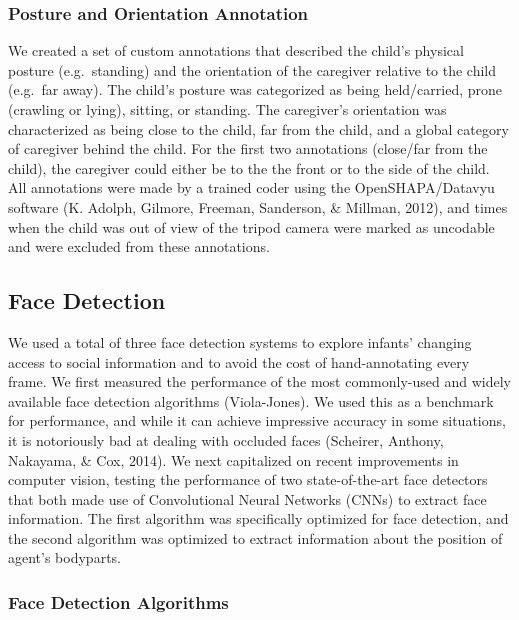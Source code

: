 \documentclass[10pt, letterpaper]{article}
\begin{document}
\subsubsection{Posture and Orientation
Annotation}\label{posture-and-orientation-annotation}

We created a set of custom annotations that described the child's
physical posture (e.g.~standing) and the orientation of the caregiver
relative to the child (e.g.~far away). The child's posture was
categorized as being held/carried, prone (crawling or lying), sitting,
or standing. The caregiver's orientation was characterized as being
close to the child, far from the child, and a global category of
caregiver behind the child. For the first two annotations (close/far
from the child), the caregiver could either be to the the front or to
the side of the child. All annotations were made by a trained coder
using the OpenSHAPA/Datavyu software (K. Adolph, Gilmore, Freeman,
Sanderson, \& Millman, 2012), and times when the child was out of view
of the tripod camera were marked as uncodable and were excluded from
these annotations.

\subsection{Face Detection}\label{face-detection}

We used a total of three face detection systems to explore infants'
changing access to social information and to avoid the cost of
hand-annotating every frame. We first measured the performance of the
most commonly-used and widely available face detection algorithms
(Viola-Jones). We used this as a benchmark for performance, and while it
can achieve impressive accuracy in some situations, it is notoriously
bad at dealing with occluded faces (Scheirer, Anthony, Nakayama, \& Cox,
2014). We next capitalized on recent improvements in computer vision,
testing the performance of two state-of-the-art face detectors that both
made use of Convolutional Neural Networks (CNNs) to extract face
information. The first algorithm was specifically optimized for face
detection, and the second algorithm was optimized to extract information
about the position of agent's bodyparts.

\subsubsection{Face Detection
Algorithms}\label{face-detection-algorithms}
\end{document}
